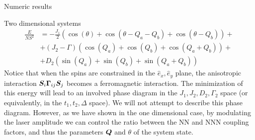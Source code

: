 \begin{section}{Numeric results}
\begin{subsection}{Two dimensional systems}
\begin{align}
\frac{E}{NS^2} &= -\frac{J_1}{2}\left( \cos(\theta) + \cos(\theta - Q_a - Q_b) + \cos(\theta - Q_b) \right) + \nonumber \\
&+ (J_2-\Gamma) \left( \cos(Q_a) + \cos(Q_b) + \cos(Q_a+Q_b) \right)+ \nonumber \\
&+D_2\left( \sin(Q_a) + \sin(Q_b) + \sin(Q_a+Q_b) \right)
\end{align}
Notice that when the spins are constrained in the $\hat{e}_x, \hat{e}_y$ plane, the anisotropic interaction $\boldsymbol{S}_i\boldsymbol{\Gamma}_{ij}\boldsymbol{S}_j$ becomes a ferromagnetic interaction. The minimization of this energy will lead to an involved phase diagram in the $J_1, J_2, D_2, \Gamma_2$ space (or equivalently, in the $t_1, t_2, \Delta$ space). We will not attempt to describe this phase diagram. However, as we have shown in the one dimensional case, by modulating the laser amplitude we can control the ratio between the NN and NNN coupling factors, and thus the parameters $\boldsymbol{Q}$ and $\theta$ of the system state.

\end{subsection}

\end{section}
